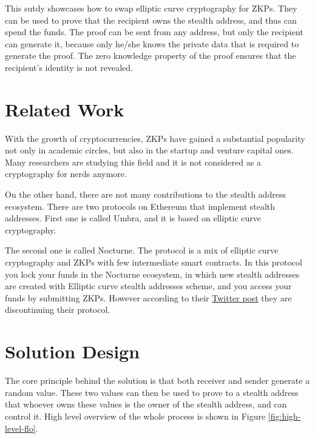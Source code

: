 \documentclass[conference,comsoc,10pt]{IEEEtran}
\begin{document}
        This sutdy showcases how to swap elliptic curve cryptography for ZKPs.
        They can be used to prove that the recipient owns the stealth address, and
        thus can spend the funds. The proof can be sent from any address, but only
        the recipient can generate it, because only he/she knows the private data
        that is required to generate the proof. The zero knowledge property of the
        proof ensures that the recipient's identity is not revealed.

    \section{Related Work}

        With the growth of cryptocurrencies, ZKPs have gained a substantial popularity
        not only in academic circles, but also in the startup and venture capital
        ones. Many researchers are studying this field and it is not considered 
        as a cryptography for nerds anymore.

        On the other hand, there are not many contributions to the stealth address
        ecosystem. There are two protocols on Ethereum that implement stealth addresses.
        First one is called Umbra\cite{umbra}, and it is based on elliptic curve
        cryptography.

        The second one is called Nocturne\cite{nocturne}. The protocol is a mix of
        elliptic curve cryptography and ZKPs with few intermediate smart contracts.
        In this protocol you lock your funds in the Nocturne ecosystem, in which
        new stealth addresses are created with Elliptic curve stealth addresses scheme,
        and you access your funds by submitting ZKPs. However according to their
        \href{https://twitter.com/nocturne_xyz/status/1749510390906511693}{Twitter post}
        they are discontinuing their protocol.

\section{Solution Design}

    The core principle behind the solution is that both
    receiver and sender generate a random value. These two values can then
    be used to prove to a stealth address that whoever owns these values
    is the owner of the stealth address, and can control it. High level
    overview of the whole process is shown in Figure \ref{fig:high-level-flo}.
\end{document}

